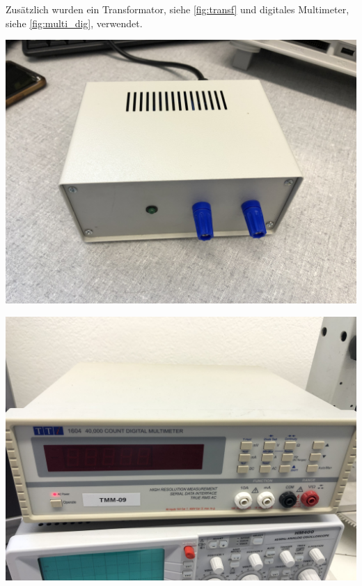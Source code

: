 \documentclass[11pt,ngerman]{scrartcl}
\begin{document}
\newpage

Zusätzlich wurden ein Transformator, siehe \autoref{fig:transf} und digitales Multimeter, siehe \autoref{fig:multi_dig}, verwendet.

\begin{minipage}{\textwidth}
	\begin{minipage}[t]{0.5\textwidth}
		\centering
		\includegraphics[width=\textwidth]{trafo}
		\label{fig:transf}
	\end{minipage}
	\vspace{2mm}
	\begin{minipage}[t]{0.5\textwidth}
		\centering
		\includegraphics[width=\textwidth]{multi_dig}
		\label{fig:multi_dig}
	\end{minipage}
	\vspace{1em}
\end{minipage}
\end{document}
